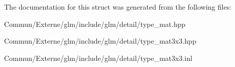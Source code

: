 The documentation for this struct was generated from the following files\+:\begin{DoxyCompactItemize}
\item 
Commun/\+Externe/glm/include/glm/detail/type\+\_\+mat.\+hpp\item 
Commun/\+Externe/glm/include/glm/detail/type\+\_\+mat3x3.\+hpp\item 
Commun/\+Externe/glm/include/glm/detail/type\+\_\+mat3x3.\+inl\end{DoxyCompactItemize}
